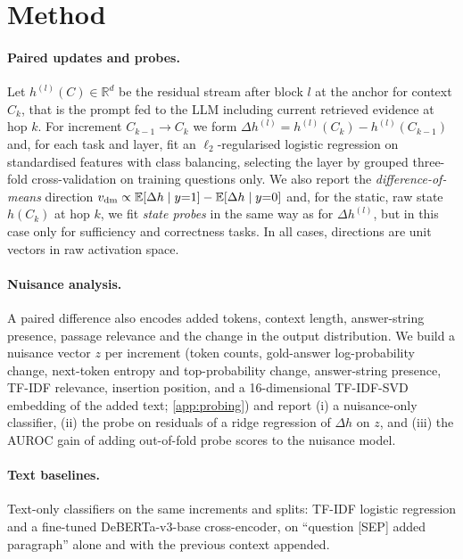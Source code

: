\section{Method}
\label{sec:method}

\paragraph{Paired updates and probes.}
Let $h^{(l)}(C)\in\mathbb R^{d}$ be the residual stream after block $l$ at the anchor for context $C_k$, that is the prompt fed to the LLM including current retrieved evidence at hop $k$. For increment $C_{k-1}\to C_k$ we form $\Delta h^{(l)}=h^{(l)}(C_k)-h^{(l)}(C_{k-1})$ and, for each task and layer, fit an $\ell_2$-regularised logistic regression on standardised features with class balancing, selecting the layer by grouped three-fold cross-validation on training questions only. We also report the \emph{difference-of-means} direction $v_{\mathrm{dm}}\propto\mathbb E[\Delta h\mid y{=}1]-\mathbb E[\Delta h\mid y{=}0]$ and, for the static, raw state $h(C_k)$ at hop $k$, we fit \emph{state probes} in the same way as for $\Delta h^{(l)}$, but in this case only for sufficiency and correctness tasks. In all cases, directions are unit vectors in raw activation space.

\paragraph{Nuisance analysis.}
A paired difference also encodes added tokens, context length, answer-string presence, passage relevance and the change in the output distribution. We build a nuisance vector $z$ per increment (token counts, gold-answer log-probability change, next-token entropy and top-probability change, answer-string presence, TF-IDF relevance, insertion position, and a 16-dimensional TF-IDF-SVD embedding of the added text; \cref{app:probing}) and report (i) a nuisance-only classifier, (ii) the probe on residuals of a ridge regression of $\Delta h$ on $z$, and (iii) the AUROC gain of adding out-of-fold probe scores to the nuisance model.

\paragraph{Text baselines.}
Text-only classifiers on the same increments and splits: TF-IDF logistic regression and a fine-tuned DeBERTa-v3-base cross-encoder, on ``question [SEP] added paragraph'' alone and with the previous context appended.

